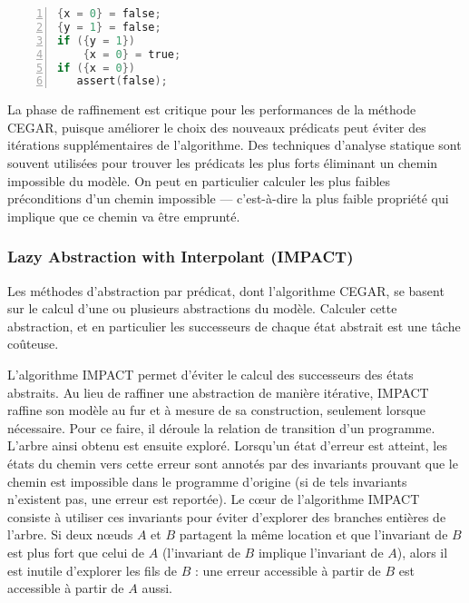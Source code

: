 \begin{minipage}{.45\textwidth}
\begin{lstlisting}[language=C, label=lst:CEGAR_3, numbers=left, frame=single,
  caption=Second raffinement]
{x = 0} = false;
{y = 1} = false;
if ({y = 1})
    {x = 0} = true;
if ({x = 0})
   assert(false);
\end{lstlisting}
\end{minipage}

La phase de raffinement est critique pour les performances de la méthode
\ac{CEGAR}, puisque améliorer le choix des nouveaux prédicats peut éviter des
itérations supplémentaires de l'algorithme. Des techniques d'analyse statique
sont souvent utilisées pour trouver les prédicats les plus forts éliminant un
chemin impossible du modèle. On peut en particulier calculer les plus faibles
préconditions d'un chemin impossible --- c'est-à-dire la plus faible propriété
qui implique que ce chemin va être emprunté.

\subsubsection{Lazy Abstraction with Interpolant (IMPACT)}

Les méthodes d'abstraction par prédicat, dont l'algorithme \ac{CEGAR}, se basent sur
le calcul d'une ou plusieurs abstractions du modèle. Calculer cette abstraction,
et en particulier les successeurs de chaque état abstrait est une tâche
coûteuse.

L'algorithme IMPACT\cite{IMPACT} permet d'éviter le calcul des successeurs des
états abstraits. Au lieu de raffiner une abstraction de manière itérative,
IMPACT raffine son modèle au fur et à mesure de sa construction, seulement
lorsque nécessaire. Pour ce faire, il déroule la relation de transition d'un
programme. L'arbre ainsi obtenu est ensuite exploré. Lorsqu'un état d'erreur
est atteint, les états du chemin vers cette erreur sont annotés par des invariants
prouvant que le chemin est impossible dans le programme d'origine (si de tels
invariants n'existent pas, une erreur est reportée). Le cœur de l'algorithme
IMPACT consiste à utiliser ces invariants pour éviter d'explorer des branches
entières de l'arbre. Si deux nœuds \(A\) et \(B\) partagent la même location et
que l'invariant de \(B\) est plus fort que celui de \(A\) (l'invariant de \(B\)
implique l'invariant de \(A\)), alors il
est inutile d'explorer les fils de \(B\) : une erreur accessible à partir de
\(B\) est accessible à partir de \(A\) aussi.

